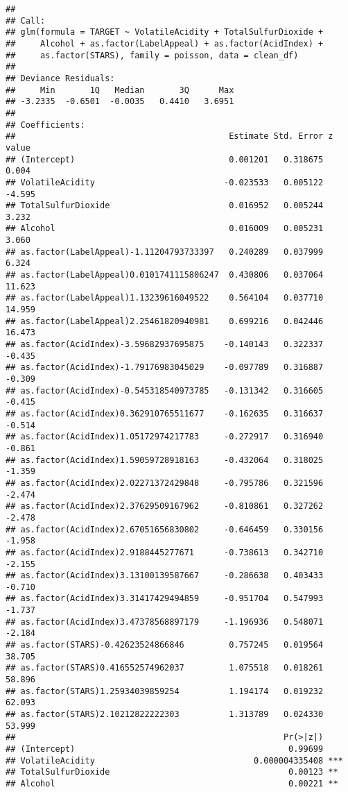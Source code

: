 \documentclass[
]{article}
\begin{document}
\begin{verbatim}
## 
## Call:
## glm(formula = TARGET ~ VolatileAcidity + TotalSulfurDioxide + 
##     Alcohol + as.factor(LabelAppeal) + as.factor(AcidIndex) + 
##     as.factor(STARS), family = poisson, data = clean_df)
## 
## Deviance Residuals: 
##     Min       1Q   Median       3Q      Max  
## -3.2335  -0.6501  -0.0035   0.4410   3.6951  
## 
## Coefficients:
##                                           Estimate Std. Error z value
## (Intercept)                               0.001201   0.318675   0.004
## VolatileAcidity                          -0.023533   0.005122  -4.595
## TotalSulfurDioxide                        0.016952   0.005244   3.232
## Alcohol                                   0.016009   0.005231   3.060
## as.factor(LabelAppeal)-1.11204793733397   0.240289   0.037999   6.324
## as.factor(LabelAppeal)0.0101741115806247  0.430806   0.037064  11.623
## as.factor(LabelAppeal)1.13239616049522    0.564104   0.037710  14.959
## as.factor(LabelAppeal)2.25461820940981    0.699216   0.042446  16.473
## as.factor(AcidIndex)-3.59682937695875    -0.140143   0.322337  -0.435
## as.factor(AcidIndex)-1.79176983045029    -0.097789   0.316887  -0.309
## as.factor(AcidIndex)-0.545318540973785   -0.131342   0.316605  -0.415
## as.factor(AcidIndex)0.362910765511677    -0.162635   0.316637  -0.514
## as.factor(AcidIndex)1.05172974217783     -0.272917   0.316940  -0.861
## as.factor(AcidIndex)1.59059728918163     -0.432064   0.318025  -1.359
## as.factor(AcidIndex)2.02271372429848     -0.795786   0.321596  -2.474
## as.factor(AcidIndex)2.37629509167962     -0.810861   0.327262  -2.478
## as.factor(AcidIndex)2.67051656830802     -0.646459   0.330156  -1.958
## as.factor(AcidIndex)2.9188445277671      -0.738613   0.342710  -2.155
## as.factor(AcidIndex)3.13100139587667     -0.286638   0.403433  -0.710
## as.factor(AcidIndex)3.31417429494859     -0.951704   0.547993  -1.737
## as.factor(AcidIndex)3.47378568897179     -1.196936   0.548071  -2.184
## as.factor(STARS)-0.42623524866846         0.757245   0.019564  38.705
## as.factor(STARS)0.416552574962037         1.075518   0.018261  58.896
## as.factor(STARS)1.25934039859254          1.194174   0.019232  62.093
## as.factor(STARS)2.10212822222303          1.313789   0.024330  53.999
##                                                      Pr(>|z|)    
## (Intercept)                                           0.99699    
## VolatileAcidity                                0.000004335408 ***
## TotalSulfurDioxide                                    0.00123 ** 
## Alcohol                                               0.00221 ** 

\end{verbatim}
\end{document}

